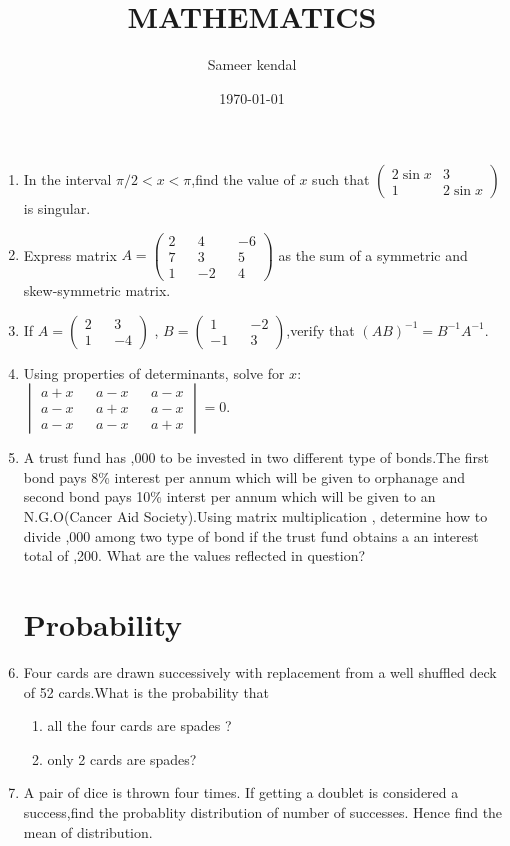 \documentclass[10pt,-letter paper]{article}
\title{MATHEMATICS}
\author{Sameer kendal}
\date{\today}
\newcommand{\myvec}[1]{\ensuremath{\begin{pmatrix}#1\end{pmatrix}}}
\newcommand{\mydet}[1]{\ensuremath{\begin{vmatrix}#1\end{vmatrix}}}
\begin{document}
\maketitle

\begin{enumerate}
\section{Matrices}

\item In the interval $\pi/2 < x < \pi$,find the value of $x$ such that $\myvec{2\sin{x} & 3 \\1 & 2\sin{x}}$ is singular.\\

\item Express matrix $A=\myvec{2&&4&&-6 \\ 7&&3&&5 \\ 1&&-2&&4}$ as the sum of a symmetric and skew-symmetric matrix.\\
\item If $A = \myvec{2&&3 \\ 1&&-4}$ , $B = \myvec{1&&-2 \\ -1&&3}$,verify that $(AB)^{-1} = B^{-1} A^{-1}$.\\

\item Using properties of determinants, solve for $x$: $\mydet{a+x&&a-x&&a-x \\ a-x&&a+x&&a-x \\a-x&&a-x&&a+x } = 0$.\\

\item A trust fund has ,000 to be invested in two different type of bonds.The first bond pays 8\% interest per annum which will be given to orphanage and second bond pays 10\% interst per annum which will be given to an N.G.O(Cancer Aid Society).Using matrix multiplication , determine how to divide ,000 among two type of bond if the trust fund obtains a an interest total of ,200. What are the values reflected in question?\\  

\section{Probability}

\item Four cards are drawn successively with replacement from a well shuffled deck of 52 cards.What is the probability that\\
\begin{enumerate}
\item all the four cards are spades ?\\
\item only 2 cards are spades?
\end{enumerate}
\item A pair of dice is thrown four times. If getting a doublet is considered a success,find the probablity distribution of number of successes. Hence find the mean of distribution.



\end{enumerate}
\end{document}
